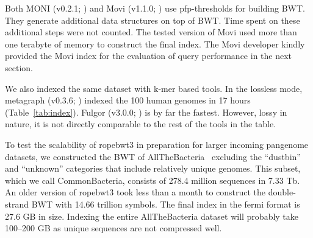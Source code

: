 \documentclass[webpdf,contemporary,large,namedate]{oup-authoring-template}%
\begin{document}
Both MONI (v0.2.1; \citealt*{Rossi:2022aa}) and Movi (v1.1.0; \citealt*{Zakeri:2024aa}) use pfp-thresholds for building BWT.
They generate additional data structures on top of BWT.
Time spent on these additional steps were not counted.
The tested version of Movi used more than one terabyte of memory to construct the final index.
The Movi developer kindly provided the Movi index for the evaluation of query performance in the next section.

We also indexed the same dataset with k-mer based tools.
In the lossless mode, metagraph (v0.3.6; \citealt*{Karasikov2020.10.01.322164}) indexed the 100 human genomes in 17 hours (Table~\ref{tab:index}).
Fulgor (v3.0.0; \citealt*{Fan:2024aa}) is by far the fastest.
However, lossy in nature, it is not directly comparable to the rest of the tools in the table.

To test the scalability of ropebwt3 in preparation for larger incoming pangenome datasets,
we constructed the BWT of AllTheBacteria~\citep{Hunt2024.03.08.584059} excluding the ``dustbin'' and ``unknown'' categories that include relatively unique genomes.
This subset, which we call CommonBacteria, consists of 278.4 million sequences in 7.33 Tb.
An older version of ropebwt3 took less than a month to construct the double-strand BWT with 14.66 trillion symbols.
The final index in the fermi format is 27.6 GB in size.
Indexing the entire AllTheBacteria dataset will probably take 100--200 GB as unique sequences are not compressed well.
\end{document}
